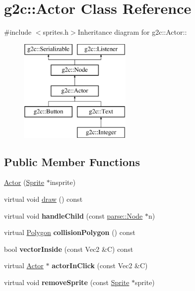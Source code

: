 \hypertarget{classg2c_1_1_actor}{
\section{g2c::Actor Class Reference}
\label{classg2c_1_1_actor}
}


{\ttfamily \#include $<$sprites.h$>$}Inheritance diagram for g2c::Actor::\begin{figure}[H]
\begin{center}
\leavevmode
\includegraphics[height=5cm]{classg2c_1_1_actor}
\end{center}
\end{figure}
\subsection*{Public Member Functions}
\begin{DoxyCompactItemize}
\item 
\hyperlink{classg2c_1_1_actor_a1451aed47353957d0f8d74ee50c7104a}{Actor} (\hyperlink{classg2c_1_1_sprite}{Sprite} $\ast$insprite)
\item 
virtual void \hyperlink{classg2c_1_1_actor_a587aff8d8df73dbba0c659459e094074}{draw} () const 
\item 
\hypertarget{classg2c_1_1_actor_a42f0174a2b27e7c69d9a58911e210c06}{
virtual void {\bfseries handleChild} (const \hyperlink{classparse_1_1_node}{parse::Node} $\ast$n)}
\label{classg2c_1_1_actor_a42f0174a2b27e7c69d9a58911e210c06}

\item 
\hypertarget{classg2c_1_1_actor_adb5c4a33b015a9cf16a5d1076a479a0a}{
virtual \hyperlink{classg2c_1_1_polygon}{Polygon} {\bfseries collisionPolygon} () const }
\label{classg2c_1_1_actor_adb5c4a33b015a9cf16a5d1076a479a0a}

\item 
\hypertarget{classg2c_1_1_actor_a4c188103cf877e1cde49318ea9df493a}{
bool {\bfseries vectorInside} (const Vec2 \&C) const }
\label{classg2c_1_1_actor_a4c188103cf877e1cde49318ea9df493a}

\item 
\hypertarget{classg2c_1_1_actor_a699ccadcaf7be1db90aa5b7b5d94b6f3}{
virtual \hyperlink{classg2c_1_1_actor}{Actor} $\ast$ {\bfseries actorInClick} (const Vec2 \&C)}
\label{classg2c_1_1_actor_a699ccadcaf7be1db90aa5b7b5d94b6f3}

\item 
\hypertarget{classg2c_1_1_actor_acad54bfc77fe49491b32f01f3907535f}{
virtual void {\bfseries removeSprite} (const \hyperlink{classg2c_1_1_sprite}{Sprite} $\ast$sprite)}
\label{classg2c_1_1_actor_acad54bfc77fe49491b32f01f3907535f}

\end{DoxyCompactItemize}
